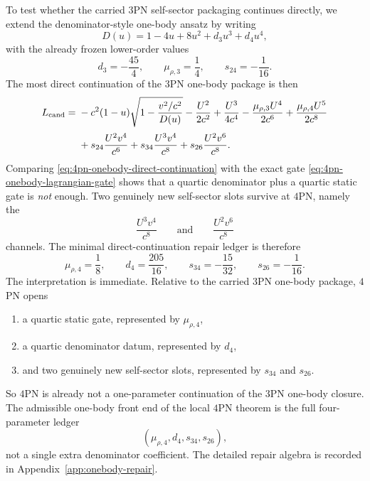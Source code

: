 \documentclass[11pt]{article}
\begin{document}
To test whether the carried $3$PN self-sector packaging continues directly, we
extend the denominator-style one-body ansatz by writing
\begin{equation}
D(u)=1-4u+8u^2+d_3u^3+d_4u^4,
\label{eq:4pn-onebody-denominator}
\end{equation}
with the already frozen lower-order values
\begin{equation}
d_3=-\frac{45}{4},
\qquad
\mu_{\rho,3}=\frac14,
\qquad
s_{24}=-\frac1{16}.
\label{eq:4pn-onebody-carried-values}
\end{equation}
The most direct continuation of the $3$PN one-body package is then
\begin{equation}
\begin{aligned}
L_{\rm cand}
={}&
-c^2(1-u)\sqrt{1-\frac{v^2/c^2}{D(u)}}
-
\frac{U^2}{2c^2}
+
\frac{U^3}{4c^4}
-
\frac{\mu_{\rho,3}U^4}{2c^6}
+
\frac{\mu_{\rho,4}U^5}{2c^8}
\\[0.5ex]
&
+
 s_{24}\frac{U^2v^4}{c^6}
+
 s_{34}\frac{U^3v^4}{c^8}
+
 s_{26}\frac{U^2v^6}{c^8}.
\end{aligned}
\label{eq:4pn-onebody-direct-continuation}
\end{equation}
Comparing \eqref{eq:4pn-onebody-direct-continuation} with the exact gate
\eqref{eq:4pn-onebody-lagrangian-gate} shows that a quartic denominator plus a
quartic static gate is \emph{not} enough.  Two genuinely new self-sector slots
survive at $4$PN, namely the
\[
\frac{U^3v^4}{c^8}
\qquad\text{and}\qquad
\frac{U^2v^6}{c^8}
\]
channels.  The minimal direct-continuation repair ledger is therefore
\begin{equation}
\boxed{
\mu_{\rho,4}=\frac18,
\qquad
 d_4=\frac{205}{16},
\qquad
 s_{34}=-\frac{15}{32},
\qquad
 s_{26}=-\frac1{16}.
}
\label{eq:4pn-onebody-repair-ledger}
\end{equation}
The interpretation is immediate.  Relative to the carried $3$PN one-body
package, $4$PN opens
\begin{enumerate}
  \item a quartic static gate, represented by $\mu_{\rho,4}$,
  \item a quartic denominator datum, represented by $d_4$,
  \item and two genuinely new self-sector slots, represented by $s_{34}$ and
  $s_{26}$.
\end{enumerate}
So $4$PN is already not a one-parameter continuation of the $3$PN one-body
closure.  The admissible one-body front end of the local $4$PN theorem is the
full four-parameter ledger
\[
(\mu_{\rho,4},d_4,s_{34},s_{26}),
\]
not a single extra denominator coefficient.  The detailed repair algebra is
recorded in Appendix~\ref{app:onebody-repair}.
\end{document}
